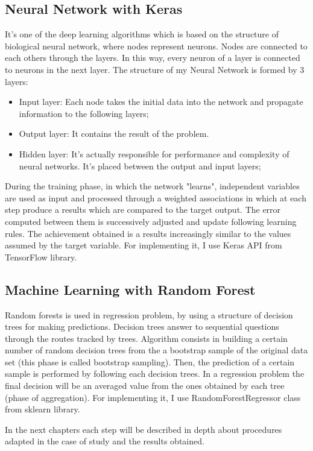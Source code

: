 \subsection{Neural Network with Keras}
It's one of the deep learning algorithms which is based on the structure of biological neural network, where nodes represent neurons.
Nodes are connected to each others through the layers. 
In this way, every neuron of a layer is connected to neurons in the next layer.
The structure of my Neural Network is formed by 3 layers:
\begin{itemize}
    \item Input layer: Each node takes the initial data into the network and propagate information to the following layers;
    \item Output layer: It contains the result of the problem. 
    \item Hidden layer: It's actually responsible for performance and complexity of neural networks. It's placed between the output and input layers;
\end{itemize}
During the training phase, in which the network "learns", independent variables are used as input and processed through a weighted associations in which at each step produce a results which are compared to the target output. The error computed between them is successively adjusted and update following learning rules. The achievement obtained is a results increasingly similar to the values assumed by the target variable. 
For implementing it, I use Keras API from TensorFlow library.


\subsection{Machine Learning with Random Forest}
Random forests is used in regression problem, by using a structure of decision trees for making predictions. Decision trees answer to sequential questions through the routes tracked by trees.
Algorithm consists in building a certain number of random decision trees from the a bootstrap sample of the original data set (this phase is called bootstrap sampling). Then, the prediction of a certain sample is performed by following each decision trees. In a regression problem the final decision will be an averaged value from the ones obtained by each tree (phase of aggregation).
For implementing it, I use RandomForestRegressor class from sklearn library. 

\bigbreak
In the next chapters each step will be described in depth about procedures adapted in the case of study and the results obtained.

